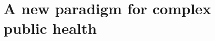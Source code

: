 \documentclass[review]{elsarticle}
\begin{document}
% 



\section{A new paradigm for complex public health}
\end{document}
